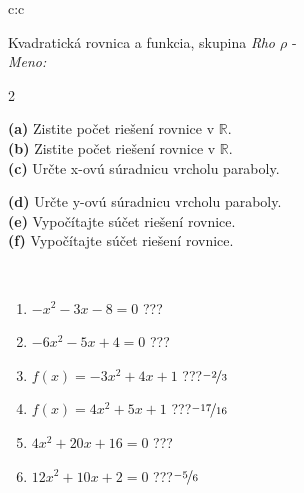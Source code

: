\documentclass[10pt]{report}
\begin{document}
\begin{tabular}{c:c}
\begin{minipage}[c][104.5mm][t]{0.5\linewidth}
\begin{center}
\vspace{7mm}
{\huge {\LARGE Kvadratická rovnica a funkcia}, skupina \textit{Rho $\rho$} -}\\[5mm]
\textit{Meno:}\phantom{xxxxxxxxxxxxxxxxxxxxxxxxxxxxxxxxxxxxxxxxxxxxxxxxxxxxxxxxxxxxxxxxx}\\[5mm]
\begin{minipage}{0.95\linewidth}
\begin{center}
{\small \begin{multicols}{2} \raggedright
\textbf{(a)} Zistite počet riešení rovnice v \(\mathbb{R}\). \\[1mm]
\textbf{(b)} Zistite počet riešení rovnice v \(\mathbb{R}\). \\[1mm]
\textbf{(c)} Určte x-ovú súradnicu vrcholu paraboly. \par \columnbreak
\textbf{(d)} Určte y-ovú súradnicu vrcholu paraboly. \\[1mm]
\textbf{(e)} Vypočítajte súčet riešení rovnice. \\[1mm]
\textbf{(f)} Vypočítajte súčet riešení rovnice.
\end{multicols}
}
\end{center}
\end{minipage}
\\[4mm]
\begin{minipage}{0.79\linewidth}
\begin{center}
\begin{varwidth}{\linewidth}
\begin{enumerate}
\Large
\item $-x^2-3x-8=0$\quad \dotfill\; ???\;\dotfill {}
\item $-6x^2-5x+4=0$\quad \dotfill\; ???\;\dotfill {}
\item $f(x)=-3x^2+4x+1$\quad \dotfill\; ???\;\dotfill \quad $\nicefrac{-2}{3}$
\item $f(x)=4x^2+5x+1$\quad \dotfill\; ???\;\dotfill \quad $\nicefrac{-17}{16}$
\item $4x^2+20x+16=0$\quad \dotfill\; ???\;\dotfill {}
\item $12x^2+10x+2=0$\quad \dotfill\; ???\;\dotfill \quad $\nicefrac{-5}{6}$
\end{enumerate}
\end{varwidth}
\end{center}

\end{minipage}
\end{center}
\end{minipage}
\end{tabular}
\end{document}
